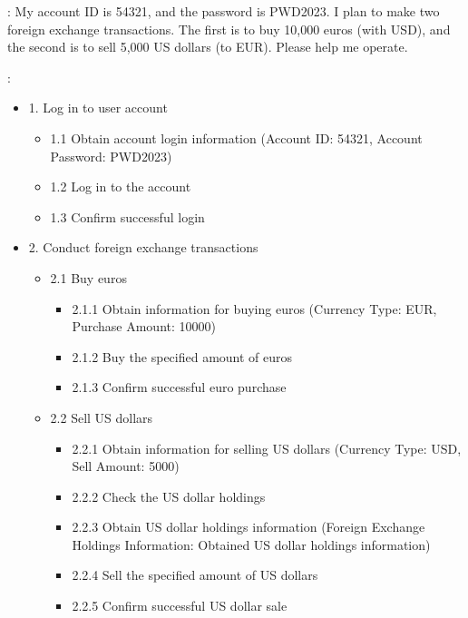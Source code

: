 

: My account ID is 54321, and the password is PWD2023. I plan to make two foreign exchange transactions. The first is to buy 10,000 euros (with USD), and the second is to sell 5,000 US dollars (to EUR). Please help me operate.

:
\begin{itemize}
    \item 1. Log in to user account
    \begin{itemize}
        \item 1.1 Obtain account login information (Account ID: 54321, Account Password: PWD2023)
        \item 1.2 Log in to the account
        \item 1.3 Confirm successful login
    \end{itemize}
    \item 2. Conduct foreign exchange transactions
    \begin{itemize}
        \item 2.1 Buy euros
        \begin{itemize}
            \item 2.1.1 Obtain information for buying euros (Currency Type: EUR, Purchase Amount: 10000)
            \item 2.1.2 Buy the specified amount of euros
            \item 2.1.3 Confirm successful euro purchase
        \end{itemize}
        \item 2.2 Sell US dollars
        \begin{itemize}
            \item 2.2.1 Obtain information for selling US dollars (Currency Type: USD, Sell Amount: 5000)
            \item 2.2.2 Check the US dollar holdings
            \item 2.2.3 Obtain US dollar holdings information (Foreign Exchange Holdings Information: Obtained US dollar holdings information)
            \item 2.2.4 Sell the specified amount of US dollars
            \item 2.2.5 Confirm successful US dollar sale
        \end{itemize}
    \end{itemize}
\end{itemize}

